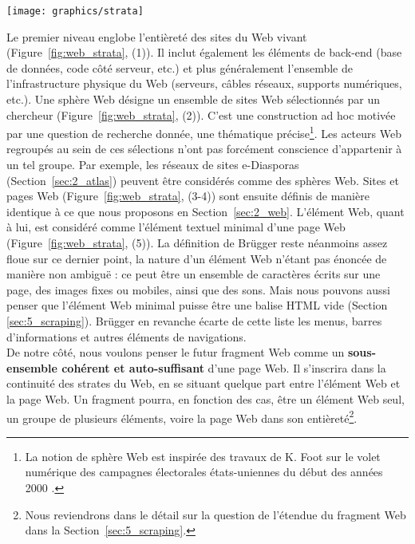 \documentclass[symmetric,justified,marginals=raggedouter]{tufte-book}
\begin{document}
\begin{figure*}
  \centering
  \texttt{[image: graphics/strata]}
  \caption{Les 5 strates analytiques du Web, d'après \citep{brugger_website_2009}}
  \label{fig:web_strata}
\end{figure*} 

\noindent Le premier niveau englobe l'entièreté des sites du Web vivant (Figure~\ref{fig:web_strata}, (1)). Il inclut également les éléments de back-end (base de données, code côté serveur, etc.) et plus généralement l'ensemble de l'infrastructure physique du Web (serveurs, câbles réseaux, supports numériques, etc.). Une sphère Web désigne un ensemble de sites Web sélectionnés par un chercheur (Figure~\ref{fig:web_strata}, (2)). C'est une construction ad hoc motivée par une question de recherche donnée, une thématique précise\footnote{\RaggedOuter La notion de sphère Web est inspirée des travaux de K. Foot sur le volet numérique des campagnes électorales états-uniennes du début des années 2000 \citep{foot_web_2006}.}. Les acteurs Web regroupés au sein de ces sélections n'ont pas forcément conscience d'appartenir à un tel groupe. Par exemple, les réseaux de sites e-Diasporas (Section~\ref{sec:2_atlas}) peuvent être considérés comme des sphères Web. Sites et pages Web (Figure~\ref{fig:web_strata}, (3-4)) sont ensuite définis de manière identique à ce que nous proposons en Section~\ref{sec:2_web}. L'élément Web, quant à lui, est considéré comme l'élément textuel minimal d'une page Web (Figure~\ref{fig:web_strata}, (5)). La définition de Brügger reste néanmoins assez floue sur ce dernier point, la nature d'un élément Web n'étant pas énoncée de manière non ambiguë : ce peut être un ensemble de caractères écrits sur une page, des images fixes ou mobiles, ainsi que des sons. Mais nous pouvons aussi penser que l'élément Web minimal puisse être une balise HTML vide (Section \ref{sec:5_scraping}). Brügger en revanche écarte de cette liste les menus, barres d'informations et autres éléments de navigations. \\

\noindent De notre côté, nous voulons penser le futur fragment Web comme un \textbf{sous-ensemble cohérent et auto-suffisant} d'une page Web. Il s'inscrira dans la continuité des strates du Web, en se situant quelque part entre l'élément Web et la page Web. Un fragment pourra, en fonction des cas, être un élément Web seul, un groupe de plusieurs éléments, voire la page Web dans son entièreté\footnote{\RaggedOuter Nous reviendrons dans le détail sur la question de l'étendue du fragment Web dans la Section~\ref{sec:5_scraping}.}. 
\end{document}
